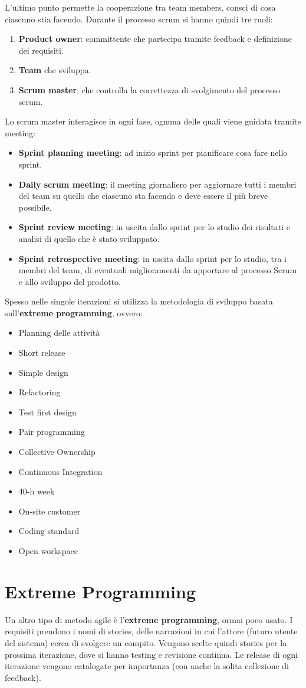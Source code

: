 L'ultimo punto permette la cooperazione tra team members, consci di cosa ciascuno
stia facendo. Durante il processo scrum si hanno quindi tre ruoli:
\begin{enumerate}
      \item \textbf{Product owner}: committente che partecipa tramite feedback
            e definizione dei requisiti.
      \item \textbf{Team} che sviluppa.
      \item \textbf{Scrum master}: che controlla la correttezza di svolgimento
            del processo scrum.
\end{enumerate}
Lo scrum master interagisce in ogni fase, ognuna delle quali viene guidata
tramite meeting:
\begin{itemize}
      \item \textbf{Sprint planning meeting}: ad inizio sprint per pianificare
            cosa fare nello sprint.
      \item \textbf{Daily scrum meeting}: il meeting giornaliero per aggiornare
            tutti i membri del team su quello che ciascuno sta facendo e deve
            essere il più breve possibile.
      \item \textbf{Sprint review meeting}: in uscita dallo sprint per lo studio
            dei risultati e analisi di quello che è stato sviluppato.
      \item \textbf{Sprint retrospective meeting}: in uscita dallo sprint per lo
            studio, tra i membri del team, di eventuali miglioramenti da apportare
            al processo Scrum e allo sviluppo del prodotto.
\end{itemize}
Spesso nelle singole iterazioni si utilizza la metodologia di sviluppo basata
sull'\textbf{extreme programming}, ovvero:
\begin{itemize}
      \item Planning delle attività
      \item Short release
      \item Simple design
      \item Refactoring
      \item Test first design
      \item Pair programming
      \item Collective Ownership
      \item Continuous Integration
      \item 40-h week
      \item On-site customer
      \item Coding standard
      \item Open workspace
\end{itemize}
\section{Extreme Programming}
Un altro tipo di metodo agile è l'\textbf{extreme programming}, ormai poco usato.
I requisiti prendono i nomi di stories, delle narrazioni in cui l'attore
(futuro utente del sistema) cerca di svolgere un compito. Vengono scelte quindi
stories per la prossima iterazione, dove si hanno testing e revisione continua.
Le release di ogni iterazione vengono catalogate per importanza (con anche la
solita collezione di feedback).